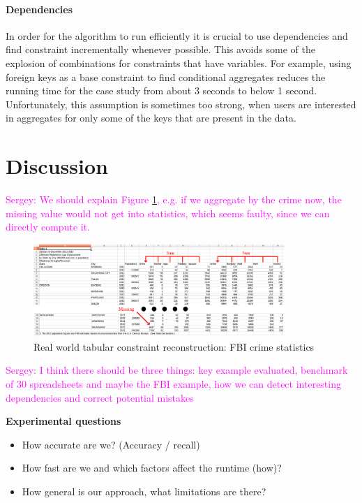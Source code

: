 \documentclass{ecai}
\newcommand{\sergey}[1]{\textcolor{magenta}{{\sc Sergey:} #1}\xspace}
\begin{document}
\paragraph{Dependencies}
In order for the algorithm to run efficiently it is crucial to use dependencies and find constraint incrementally whenever possible.
This avoids some of the explosion of combinations for constraints that have variables.
For example, using foreign keys as a base constraint to find conditional aggregates reduces the running time for the case study from about 3 seconds to below 1 second.
Unfortunately, this assumption is sometimes too strong, when users are interested in aggregates for only some of the keys that are present in the data.

\section{Discussion}
\sergey{We should explain Figure \ref{fig:fbi}, e.g. if we aggregate by the crime now, the missing value would not get into statistics, which seems faulty, since we can directly compute it.}

\begin{figure}[thb]
  \begin{center}
    \includegraphics[width=0.85\textwidth]{figures/fbi_figure_highlighted.png}
  \end{center}
  \caption{Real world tabular constraint reconstruction: FBI crime statistics}
  \label{fig:fbi}
\end{figure}


\sergey{I think there should be three things: key example evaluated, benchmark of 30 spreadsheets and maybe the FBI example, how we can detect interesting dependencies and correct potential mistakes}


{\bfseries
  Experimental questions
}

\begin{itemize}
  \item  How accurate are we? (Accuracy / recall)
  \item  How fast are we and which factors affect the runtime (how)?
  \item  How general is our approach, what limitations are there?
\end{itemize}
\end{document}
